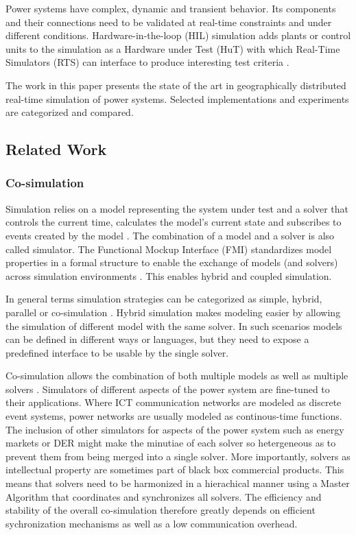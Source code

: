 \documentclass[a4paper,ngerman]{atseminar}
\begin{document}
Power systems have complex, dynamic and transient behavior. Its components and their connections need to be validated at real-time constraints and under different conditions. Hardware-in-the-loop (HIL) simulation adds plants or control units to the simulation as a Hardware under Test (HuT) with which Real-Time Simulators (RTS) can interface to produce interesting test criteria \cite{deJong2012}. 

The work in this paper presents the state of the art in geographically distributed real-time simulation of power systems. Selected implementations and experiments are categorized and compared. 


\subsection{Related Work}

\subsubsection{Co-simulation}

Simulation relies on a model representing the system under test and a solver that controls the current time, calculates the model's current state and subscribes to events created by the model \cite{palensky2017}. The combination of a model and a solver is also called simulator. The Functional Mockup Interface (FMI) standardizes model properties in a formal structure to enable the exchange of models (and solvers) across simulation environments \cite{fmi}. This enables hybrid and coupled simulation.

In general terms simulation strategies can be categorized as simple, hybrid, parallel or co-simulation \cite{palensky2017}. Hybrid simulation makes modeling easier by allowing the simulation of different model with the same solver. In such scenarios models can be defined in different ways or languages, but they need to expose a predefined interface to be usable by the single solver. 

Co-simulation allows the combination of both multiple models as well as multiple solvers \cite{palensky2017}. Simulators of
different aspects of the power system are fine-tuned to their applications. Where ICT communication networks are modeled as discrete event systems, power networks are usually modeled as continous-time functions. The inclusion of other simulators for aspects of the power system such as energy markets or DER might make the minutiae of each solver so hetergeneous as to prevent them from being merged into a single solver. More importantly, solvers as intellectual property are sometimes part of black
box commercial products. This means that solvers need to be harmonized in a hierachical manner using a Master Algorithm that coordinates and synchronizes all solvers. The efficiency and stability of the overall co-simulation therefore greatly depends on efficient sychronization mechanisms as well as a low communication overhead.
\end{document}
